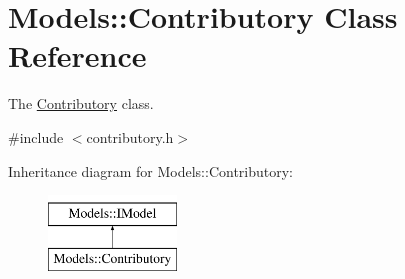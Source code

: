 \hypertarget{classModels_1_1Contributory}{\section{Models\-:\-:Contributory Class Reference}
\label{classModels_1_1Contributory}
}


The \hyperlink{classModels_1_1Contributory}{Contributory} class.  




{\ttfamily \#include $<$contributory.\-h$>$}

Inheritance diagram for Models\-:\-:Contributory\-:\begin{figure}[H]
\begin{center}
\leavevmode
\includegraphics[height=2.000000cm]{d5/dd1/classModels_1_1Contributory}
\end{center}
\end{figure}
